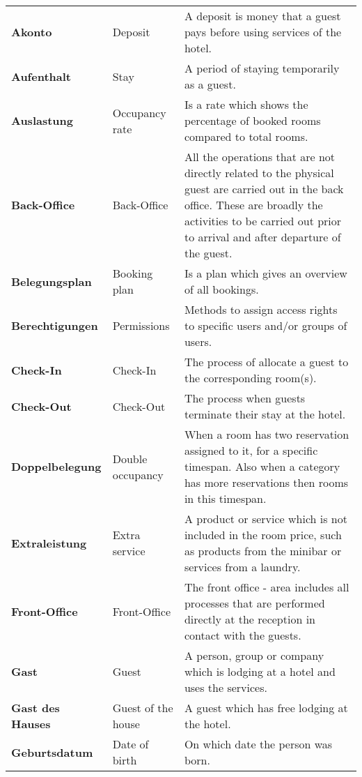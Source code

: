 \documentclass[../Pflichtenheft.tex]{subfiles}
\begin{document}
    \begin{longtable}{p{4cm} p{4cm} p{6cm}}
        \textbf{Akonto} & {Deposit} & A deposit is money that a guest pays before using services of the hotel. \\[0.5cm]
        \textbf{Aufenthalt} & {Stay} & A period of staying temporarily as a guest. \\[0.5cm]
		\textbf{Auslastung} & {Occupancy rate} & Is a rate which shows the percentage of booked rooms compared to total rooms. \\[0.5cm]
        \textbf{Back-Office} & {Back-Office} & All the operations that are not directly related to the physical guest are carried out in the back office. These are broadly the activities to be carried out prior to arrival and after departure of the guest. \\[0.5cm]
		\textbf{Belegungsplan} & {Booking plan} & Is a plan which gives an overview of all bookings. \\[0.5cm]
        \textbf{Berechtigungen} & {Permissions} & Methods to assign access rights to specific users and/or groups of users. \\[0.5cm]
        \textbf{Check-In} & {Check-In} & The process of allocate a guest to the corresponding room(s). \\[0.5cm]
        \textbf{Check-Out} & {Check-Out} & The process when guests terminate their stay at the hotel. \\[0.5cm]
        \textbf{Doppelbelegung} & {Double occupancy} & When a room has two reservation assigned to it, for a specific timespan. Also when a category has more reservations then rooms in this timespan. \\[0.5cm]
        \textbf{Extraleistung} & {Extra service} & A product or service which is not included in the room price, such as products from the minibar or services from a laundry. \\[0.5cm]
        \textbf{Front-Office} & {Front-Office} & The front office - area includes all processes that are performed directly at the reception in contact with the guests. \\[0.5cm]
        \textbf{Gast} & {Guest} & A person, group or company which is lodging at a hotel and uses the services. \\[0.5cm]
        \textbf{Gast des Hauses} & {Guest of the house} & A guest which has free lodging at the hotel. \\[0.5cm]
        \textbf{Geburtsdatum} & {Date of birth} & On which date the person was born. \\[0.5cm]

\end{longtable}
\end{document}
